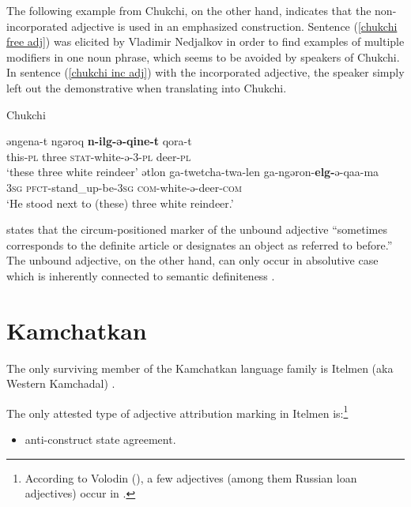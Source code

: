 The following example from Chukchi, on the other hand, indicates that the non-incorporated adjective is used in an emphasized construction. Sentence (\ref{chukchi free adj}) was elicited by Vladimir Nedjalkov \citep[cited as a personal communication in][330]{rijkhoff2002} in order to find examples of multiple modifiers in one noun phrase, which seems to be avoided by speakers of Chukchi. In sentence (\ref{chukchi inc adj}) with the incorporated adjective, the speaker simply left out the demonstrative when translating into Chukchi.
\begin{exe}
\ex \rm{Chukchi \citep[Vladimir Nedjalkov, p.c., cit.][330]{rijkhoff2002}}
\begin{xlist}
\ex
\label{chukchi free adj}
\gll	əngena-t ngəroq \textbf{n-ilg-ə-qine-t} qora-t\\
	this-\textsc{pl} three \textsc{stat}-white-ə-3-\textsc{pl} deer-\textsc{pl}\\
\glt	‘these three white reindeer’
\ex
\label{chukchi inc adj}
\gll	ətlon ga-twetcha-twa-len ga-ngəron-\textbf{elg-}ə-qaa-ma\\
	\textsc{3sg} \textsc{pfct}-stand\_up-be-\textsc{3sg} \textsc{com}-white-ə-deer-\textsc{com}\\
\glt	‘He stood next to (these) three white reindeer.’
\end{xlist}
\end{exe}
\citet[716]{bogoras1922} states that the circum-positioned marker of the unbound adjective “sometimes corresponds to the definite article or designates an object as referred to before.” The unbound adjective, on the other hand, can only occur in absolutive case which is inherently connected to semantic definiteness \citep[cf.][207, passim]{dunn1999}.

\section{Kamchatkan}
The only surviving member of the Kamchatkan language family is Itelmen (aka Western Kamchadal) \citep[224]{salminen2007}.

The only attested type of adjective attribution marking in Itelmen is:\footnote{According to Volodin (\citeyear{volodin1997}), a few adjectives (among them Russian loan adjectives) occur in .}
\begin{itemize}
\item anti\hyp{}construct state agreement.
\end{itemize}

